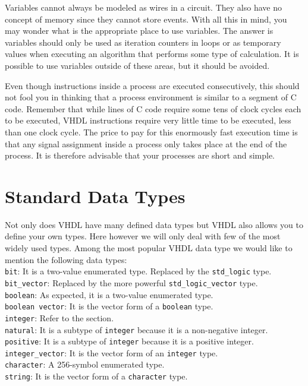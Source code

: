 Variables cannot always be modeled as wires in a circuit. They also have no concept of memory since they cannot store events. With all this in mind, you may wonder what is the appropriate place to use variables. The answer is variables should only be used as iteration counters in loops or as temporary values when executing an algorithm that performs some type of calculation. It is possible to use variables outside of these areas, but it should be avoided.

Even though instructions inside a process are executed consecutively, this should not fool you in thinking that a process environment is similar to a segment of C code. Remember that while lines of C code require some tens of clock cycles each to be executed, VHDL instructions require very little time to be executed, less than one clock cycle. The price to pay for this enormously fast execution time is that any signal assignment inside a process only takes place at the end of the process. It is therefore advisable that your processes are short and simple.

\section{Standard Data Types}
Not only does VHDL have many defined data types but VHDL also allows you to define your own types. Here however we will only deal with few of the most widely used types. Among the most popular VHDL data type we would like to mention the following data types:\\

\noindent
\texttt{bit}: It is a two-value enumerated type. Replaced by the \texttt{std\_logic} type.\\
\texttt{bit\_vector}: Replaced by the more powerful \texttt{std\_logic\_vector} type.\\
\texttt{boolean}: As expected, it is a two-value enumerated type.\\
\texttt{boolean vector}: It is the vector form of a \texttt{boolean} type.\\
\texttt{integer}: Refer to the  section.\\
\texttt{natural}: It is a subtype of \texttt{integer} because it is a non-negative integer.\\
\texttt{positive}: It is a subtype of \texttt{integer} because it is a positive integer.\\
\texttt{integer\_vector}: It is the vector form of an \texttt{integer} type.\\
\texttt{character}: A 256-symbol enumerated type.\\
\texttt{string}: It is the vector form of a \texttt{character} type.\\

